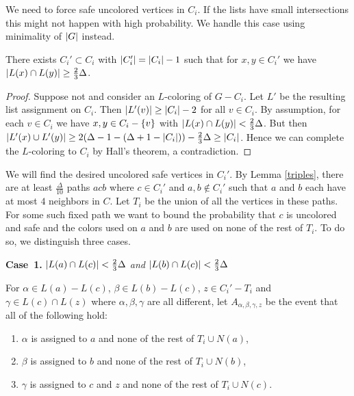 We need to force safe uncolored vertices in $C_i$.  If the lists have small
intersections this might not happen with high probability.  We handle this case
using minimality of $\left|G\right|$ instead.

\begin{lem}\label{LargeIntersections}
There exists $C_i' \subset C_i$ with $\left|C_i'\right| = \left|C_i\right| - 1$ such that
for $x, y \in C_i'$ we have $\left|L(x) \cap L(y)\right| \geq \frac23 \Delta$.
\end{lem}
\begin{proof}
Suppose not and consider an $L$-coloring of $G - C_i$.  Let $L'$ be the
resulting list assignment on $C_i$.  Then $\left|L'(v)\right| \geq \left|C_i\right| - 2$ for
all $v \in C_i$.  By assumption, for each $v \in C_i$ we have $x, y \in C_i -
\left\{ v \right\}$ with $\left|L(x) \cap L(y)\right| < \frac23 \Delta$.  But then $\left|L'(x) \cup
L'(y)\right| \geq 2(\Delta - 1 - (\Delta + 1 - \left|C_i\right|)) - \frac23 \Delta \geq
\left|C_i\right|$.  Hence we can complete the $L$-coloring to $C_i$ by Hall's theorem,
a contradiction.
\end{proof}

We will find the desired uncolored safe vertices in $C_i'$.  By Lemma
\ref{triples}, there are at least $\frac{\Delta}{10}$ paths $acb$ where $c \in
C_i'$ and $a,b \not \in C_i'$ such that $a$ and $b$ each have at most $4$
neighbors in $C$.  Let $T_i$ be the union of all the vertices in these paths. 
For some such fixed path we want to bound the probability that $c$ is uncolored and safe and the colors used on $a$ and $b$ are used on
none of the rest of $T_i$.  To do so, we distinguish three cases.

\textbf{Case~1.} \textit{$\left|L(a) \cap L(c)\right| < \frac23 \Delta$ and
$\left|L(b) \cap L(c)\right| < \frac23 \Delta$}

For $\alpha \in L(a) - L(c)$, $\beta \in L(b) - L(c)$, $z \in C_i' - T_i$ and
$\gamma \in L(c) \cap L(z)$ where $\alpha, \beta, \gamma$ are all different, let
$A_{\alpha, \beta, \gamma, z}$ be the event that all of the following hold:

\begin{enumerate}
  \item $\alpha$ is assigned to $a$ and none of the rest of $T_i \cup N(a)$,
  \item $\beta$ is assigned to $b$ and none of the rest of $T_i \cup N(b)$,
  \item $\gamma$ is assigned to $c$ and $z$ and none of the rest of $T_i \cup N(c)$.
\end{enumerate}


